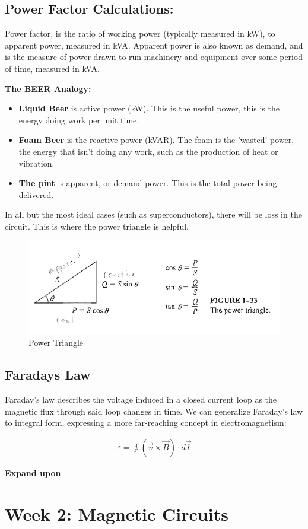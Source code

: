 \documentclass{book}
\begin{document}
\subsection{Power Factor Calculations:}

Power factor, is the ratio of working power (typically measured in kW), to apparent power, measured in kVA. Apparent power is also known as demand, and is the measure of power drawn to run machinery and equipment over some period of time, measured in kVA. 

\textbf{The BEER Analogy:}
\begin{itemize}
	\item \textbf{Liquid Beer} is active power (kW). This is the useful power, this is the energy doing work per unit time.
	\item \textbf{Foam Beer} is the reactive power (kVAR). The foam is the 'wasted' power, the energy that isn't doing any work, such as the production of heat or vibration.
	\item \textbf{The pint} is apparent, or demand power. This is the total power being delivered. 
\end{itemize}

In all but the most ideal cases (such as superconductors), there will be loss in the circuit.  This is where the power triangle is helpful.
\begin{figure}[h]
	\centering
	\includegraphics[width=0.4\linewidth]{Screenshots/power_triangle}
	\caption{Power Triangle}
	\label{fig:powertriangle}
\end{figure}
\subsection{Faradays Law}

Faraday's law describes the voltage induced in a closed current loop as the magnetic flux through said loop changes in time. We can generalize Faraday's law to integral form, expressing a more far-reaching concept in electromagnetism:

\begin{align*}
	\varepsilon = \oint (\vec{v} \times \vec{B}) \cdot d \vec{l}
\end{align*}

\textbf{Expand upon}
\section{Week 2: Magnetic Circuits}
\end{document}
